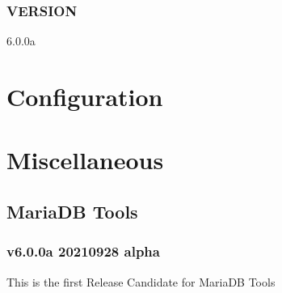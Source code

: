 \documentclass[letterpaper,10pt,english]{sphinxmanual}
\begin{document}
\section{VERSION}
\label{\detokenize{mariadb-system-summary:version}}
\sphinxAtStartPar
{} 6.0.0a


\part{Configuration}
\label{\detokenize{index:configuration}}

\part{Miscellaneous}
\label{\detokenize{index:miscellaneous}}

\chapter{MariaDB Tools}
\label{\detokenize{release_notes:mariadb-tools}}\label{\detokenize{release_notes::doc}}

\section{v6.0.0a \sphinxhyphen{} 2021\sphinxhyphen{}09\sphinxhyphen{}28 \sphinxhyphen{} alpha}
\label{\detokenize{release_notes:v6-0-0a-2021-09-28-alpha}}
\sphinxAtStartPar
This is the first Release Candidate for MariaDB Tools



\renewcommand{\indexname}{Index}
\printindex
\end{document}
